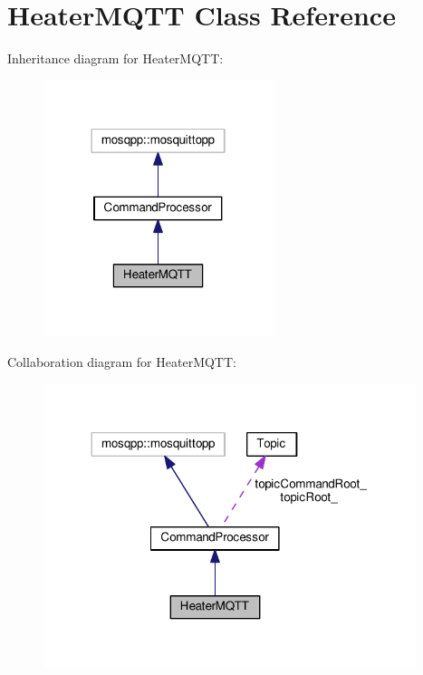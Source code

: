 \hypertarget{class_heater_m_q_t_t}{}\section{Heater\+M\+Q\+TT Class Reference}
\label{class_heater_m_q_t_t}


Inheritance diagram for Heater\+M\+Q\+TT\+:
\nopagebreak
\begin{figure}[H]
\begin{center}
\leavevmode
\includegraphics[width=190pt]{class_heater_m_q_t_t__inherit__graph}
\end{center}
\end{figure}


Collaboration diagram for Heater\+M\+Q\+TT\+:
\nopagebreak
\begin{figure}[H]
\begin{center}
\leavevmode
\includegraphics[width=308pt]{class_heater_m_q_t_t__coll__graph}
\end{center}
\end{figure}

